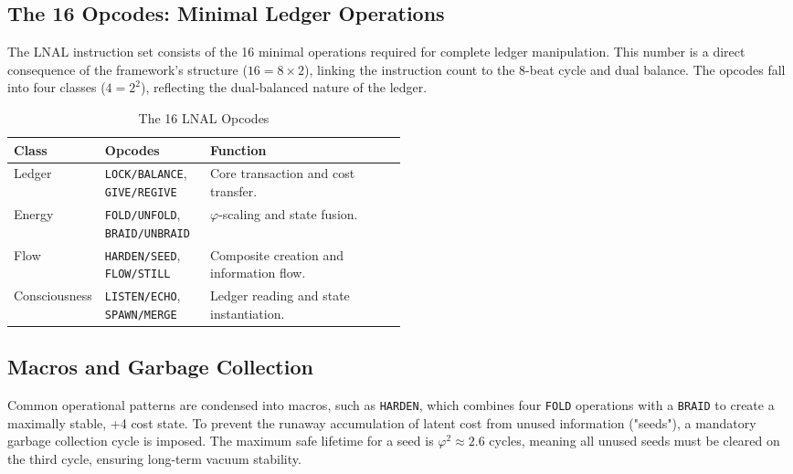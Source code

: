 \documentclass[11pt,a4paper]{article}
\begin{document}
\subsection{The 16 Opcodes: Minimal Ledger Operations}
The LNAL instruction set consists of the 16 minimal operations required for complete ledger manipulation. This number is a direct consequence of the framework's structure (\(16 = 8 \times 2\)), linking the instruction count to the 8-beat cycle and dual balance. The opcodes fall into four classes (\(4=2^2\)), reflecting the dual-balanced nature of the ledger.

\begin{table}[h!]
\centering
\caption{The 16 LNAL Opcodes}
\label{tab:opcodes}
\begin{tabular}{llp{0.5\linewidth}}
\toprule
\textbf{Class} & \textbf{Opcodes} & \textbf{Function} \\
\midrule
Ledger & \texttt{LOCK/BALANCE}, \texttt{GIVE/REGIVE} & Core transaction and cost transfer. \\
Energy & \texttt{FOLD/UNFOLD}, \texttt{BRAID/UNBRAID} & \(\varphi\)-scaling and state fusion. \\
Flow & \texttt{HARDEN/SEED}, \texttt{FLOW/STILL} & Composite creation and information flow. \\
Consciousness & \texttt{LISTEN/ECHO}, \texttt{SPAWN/MERGE} & Ledger reading and state instantiation. \\
\bottomrule
\end{tabular}
\end{table}

\subsection{Macros and Garbage Collection}
Common operational patterns are condensed into macros, such as \texttt{HARDEN}, which combines four \texttt{FOLD} operations with a \texttt{BRAID} to create a maximally stable, +4 cost state. To prevent the runaway accumulation of latent cost from unused information ("seeds"), a mandatory garbage collection cycle is imposed. The maximum safe lifetime for a seed is \(\varphi^2 \approx 2.6\) cycles, meaning all unused seeds must be cleared on the third cycle, ensuring long-term vacuum stability.
\end{document}
